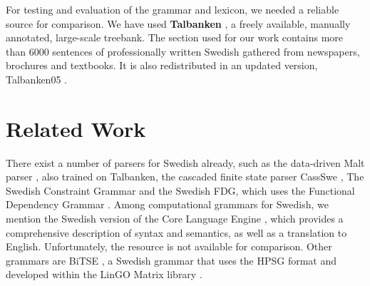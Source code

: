 \documentclass[runningheads,a4paper]{llncs}
\begin{document}
For testing and evaluation of the grammar and lexicon, we needed 
a reliable source for comparison.
We have used \textbf{Talbanken} \cite{talbanken},
a freely available, manually annotated, large-scale treebank.
The section used for our
work contains more than 6000 sentences
of professionally written Swedish gathered from newspapers, brochures and textbooks.
It is also redistributed in an updated version,
Talbanken05 \cite{talbanken05}.



 
\section{Related Work}
%
There exist a number of parsers for Swedish already, such as the
data-driven Malt parser \cite{malt}, also trained on Talbanken, the 
cascaded finite state parser CassSwe \cite{casswe}, %
The Swedish Constraint Grammar \cite{birn} and the Swedish FDG, which
uses the Functional Dependency Grammar \cite{fdg}.
Among computational grammars for Swedish, we mention the Swedish
version of the Core Language Engine \cite{gamback}, which
provides a comprehensive description of syntax and semantics, as well
as a translation to English. Unfortunately, the resource is not
available for comparison. Other grammars are BiTSE \cite{stymne}, a
Swedish grammar that uses the HPSG format \cite{hpsg} and developed
within the LinGO Matrix library \cite{matrix}. 
\end{document}
